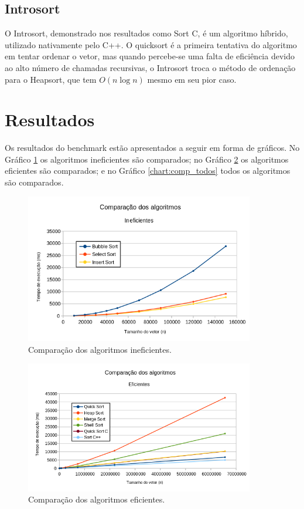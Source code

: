 \documentclass[11pt, brazil, a4paper, usenames, svgnames, dvipsnames]{article}
\begin{document}
\subsection{Introsort}

O Introsort, demonstrado nos resultados como Sort C, é um algoritmo híbrido, utilizado nativamente pelo C++. O quicksort é a primeira tentativa do algoritmo em tentar ordenar o vetor, mas quando percebe-se uma falta de eficiência devido ao alto número de chamadas recursivas, o Introsort troca o método de ordenação para o Heapsort, que tem $O(n \log{n})$ mesmo em seu pior caso.

\section{Resultados}

\hfill

Os resultados do benchmark estão apresentados a seguir em forma de gráficos. No
Gráfico \ref{chart:comp_inefic} os algoritmos ineficientes são comparados; no
Gráfico \ref{chart:comp_efic} os algoritmos eficientes são comparados; e no Gráfico
\ref{chart:comp_todos} todos os algoritmos são comparados.  

\noindent

\begin{figure}[hb]
	\centering
	\includegraphics[width=10cm]{comp_inefic.png}
	\caption[Comparação dos algoritmos ineficientes.]
	{Comparação dos algoritmos ineficientes.}
	\label{chart:comp_inefic}
\end{figure}

\begin{figure}[hb]
	\centering
	\includegraphics[width=10cm]{comp_efic.png}
	\caption[Comparação dos algoritmos eficientes.]
	{Comparação dos algoritmos eficientes.}
	\label{chart:comp_efic}
\end{figure}
\end{document}
